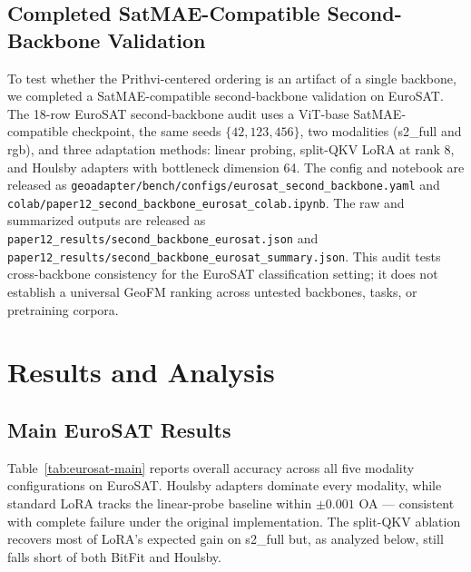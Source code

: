 \documentclass[11pt]{article}
\begin{document}
\subsection{Completed SatMAE-Compatible Second-Backbone Validation}
To test whether the Prithvi-centered ordering is an artifact of a single backbone, we completed a SatMAE-compatible second-backbone validation on EuroSAT. The 18-row EuroSAT second-backbone audit uses a ViT-base SatMAE-compatible checkpoint, the same seeds $\{42,123,456\}$, two modalities (s2\_full and rgb), and three adaptation methods: linear probing, split-QKV LoRA at rank 8, and Houlsby adapters with bottleneck dimension 64. The config and notebook are released as \texttt{geoadapter/bench/configs/eurosat\_second\_backbone.yaml} and \texttt{colab/paper12\_second\_backbone\_eurosat\_colab.ipynb}. The raw and summarized outputs are released as \texttt{paper12\_results/second\_backbone\_eurosat.json} and \texttt{paper12\_results/second\_backbone\_eurosat\_summary.json}. This audit tests cross-backbone consistency for the EuroSAT classification setting; it does not establish a universal GeoFM ranking across untested backbones, tasks, or pretraining corpora.
\section{Results and Analysis}
\label{sec:results}

\subsection{Main EuroSAT Results}
Table~\ref{tab:eurosat-main} reports overall accuracy across all five modality configurations on EuroSAT. Houlsby adapters dominate every modality, while standard LoRA tracks the linear-probe baseline within $\pm 0.001$ OA --- consistent with complete failure under the original implementation. The split-QKV ablation recovers most of LoRA's expected gain on s2\_full but, as analyzed below, still falls short of both BitFit and Houlsby.
\end{document}
